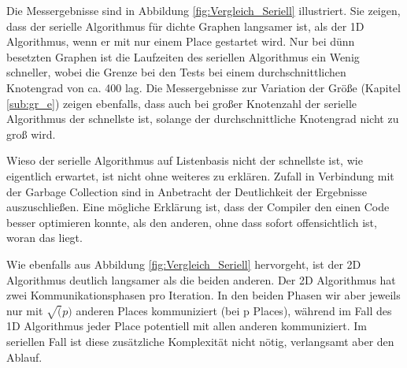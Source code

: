 Die Messergebnisse sind in Abbildung \ref{fig:Vergleich_Seriell} illustriert. Sie zeigen, dass der serielle Algorithmus für dichte Graphen langsamer ist, als der 1D Algorithmus, wenn er mit nur einem Place gestartet wird. Nur bei dünn besetzten Graphen ist die Laufzeiten des seriellen Algorithmus ein Wenig schneller, wobei die Grenze bei den Tests bei einem durchschnittlichen Knotengrad von ca. 400 lag. Die Messergebnisse zur Variation der Größe (Kapitel \ref{sub:gr_e}) zeigen ebenfalls, dass auch bei großer Knotenzahl der serielle Algorithmus der schnellste ist, solange der durchschnittliche Knotengrad nicht zu groß wird.

Wieso der serielle Algorithmus auf Listenbasis nicht der schnellste ist, wie eigentlich erwartet, ist nicht ohne weiteres zu erklären. Zufall in Verbindung mit der Garbage Collection sind in Anbetracht der Deutlichkeit der Ergebnisse auszuschließen. Eine mögliche Erklärung ist, dass der Compiler den einen Code besser optimieren konnte, als den anderen, ohne dass sofort offensichtlich ist, woran das liegt.

Wie ebenfalls aus Abbildung \ref{fig:Vergleich_Seriell} hervorgeht, ist der 2D Algorithmus deutlich langsamer als die beiden anderen. Der 2D Algorithmus hat zwei Kommunikationsphasen pro Iteration. In den beiden Phasen wir aber jeweils nur mit $\sqrt(p)$ anderen Places kommuniziert (bei p Places)\cite{Buluc:2011}, während im Fall des 1D Algorithmus jeder Place potentiell mit allen anderen kommuniziert. Im seriellen Fall ist diese zusätzliche Komplexität nicht nötig, verlangsamt aber den Ablauf.


